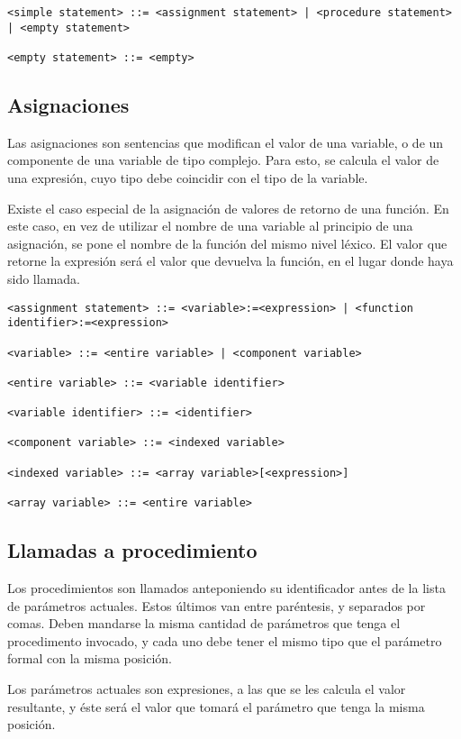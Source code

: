 \documentclass[a4paper,oneside]{report}
\begin{document}
\begin{verbatim}
<simple statement> ::= <assignment statement> | <procedure statement> | <empty statement>

<empty statement> ::= <empty>
\end{verbatim}

\subsection{Asignaciones}
Las asignaciones son sentencias que modifican el valor de una variable, o de un componente de una variable de tipo complejo. Para esto, se calcula el valor de una expresión, cuyo tipo debe coincidir con el tipo de la variable.

Existe el caso especial de la asignación de valores de retorno de una función. En este caso, en vez de utilizar el nombre de una variable al principio de una asignación, se pone el nombre de la función del mismo nivel léxico. El valor que retorne la expresión será el valor que devuelva la función, en el lugar donde haya sido llamada.

\begin{verbatim}
<assignment statement> ::= <variable>:=<expression> | <function identifier>:=<expression>

<variable> ::= <entire variable> | <component variable>

<entire variable> ::= <variable identifier>

<variable identifier> ::= <identifier>

<component variable> ::= <indexed variable>

<indexed variable> ::= <array variable>[<expression>]

<array variable> ::= <entire variable>
\end{verbatim}

\subsection{Llamadas a procedimiento}

Los procedimientos son llamados anteponiendo su identificador antes de la lista de parámetros actuales. Estos últimos van entre paréntesis, y separados por comas. Deben mandarse la misma cantidad de parámetros que tenga el procedimento invocado, y cada uno debe tener el mismo tipo que el parámetro formal con la misma posición.

Los parámetros actuales son expresiones, a las que se les calcula el valor resultante, y éste será el valor que tomará el parámetro que tenga la misma posición.
\end{document}
